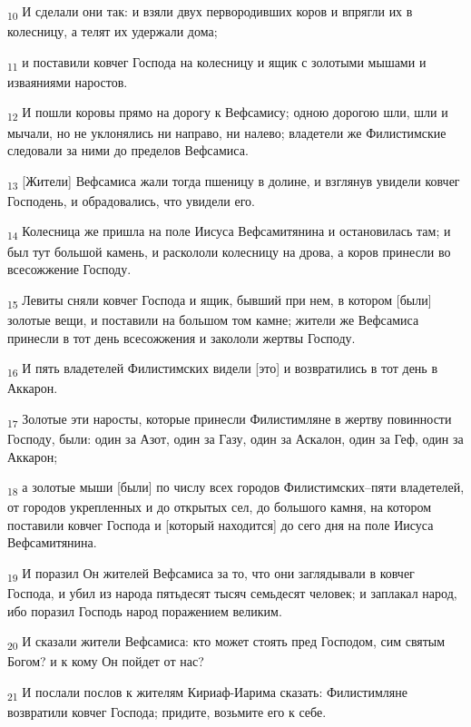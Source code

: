 \begin{tcolorbox}
\textsubscript{10} И сделали они так: и взяли двух первородивших коров и впрягли их в колесницу, а телят их удержали дома;
\end{tcolorbox}
\begin{tcolorbox}
\textsubscript{11} и поставили ковчег Господа на колесницу и ящик с золотыми мышами и изваяниями наростов.
\end{tcolorbox}
\begin{tcolorbox}
\textsubscript{12} И пошли коровы прямо на дорогу к Вефсамису; одною дорогою шли, шли и мычали, но не уклонялись ни направо, ни налево; владетели же Филистимские следовали за ними до пределов Вефсамиса.
\end{tcolorbox}
\begin{tcolorbox}
\textsubscript{13} [Жители] Вефсамиса жали тогда пшеницу в долине, и взглянув увидели ковчег Господень, и обрадовались, что увидели его.
\end{tcolorbox}
\begin{tcolorbox}
\textsubscript{14} Колесница же пришла на поле Иисуса Вефсамитянина и остановилась там; и был тут большой камень, и раскололи колесницу на дрова, а коров принесли во всесожжение Господу.
\end{tcolorbox}
\begin{tcolorbox}
\textsubscript{15} Левиты сняли ковчег Господа и ящик, бывший при нем, в котором [были] золотые вещи, и поставили на большом том камне; жители же Вефсамиса принесли в тот день всесожжения и закололи жертвы Господу.
\end{tcolorbox}
\begin{tcolorbox}
\textsubscript{16} И пять владетелей Филистимских видели [это] и возвратились в тот день в Аккарон.
\end{tcolorbox}
\begin{tcolorbox}
\textsubscript{17} Золотые эти наросты, которые принесли Филистимляне в жертву повинности Господу, были: один за Азот, один за Газу, один за Аскалон, один за Геф, один за Аккарон;
\end{tcolorbox}
\begin{tcolorbox}
\textsubscript{18} а золотые мыши [были] по числу всех городов Филистимских--пяти владетелей, от городов укрепленных и до открытых сел, до большого камня, на котором поставили ковчег Господа и [который находится] до сего дня на поле Иисуса Вефсамитянина.
\end{tcolorbox}
\begin{tcolorbox}
\textsubscript{19} И поразил Он жителей Вефсамиса за то, что они заглядывали в ковчег Господа, и убил из народа пятьдесят тысяч семьдесят человек; и заплакал народ, ибо поразил Господь народ поражением великим.
\end{tcolorbox}
\begin{tcolorbox}
\textsubscript{20} И сказали жители Вефсамиса: кто может стоять пред Господом, сим святым Богом? и к кому Он пойдет от нас?
\end{tcolorbox}
\begin{tcolorbox}
\textsubscript{21} И послали послов к жителям Кириаф-Иарима сказать: Филистимляне возвратили ковчег Господа; придите, возьмите его к себе.
\end{tcolorbox}
